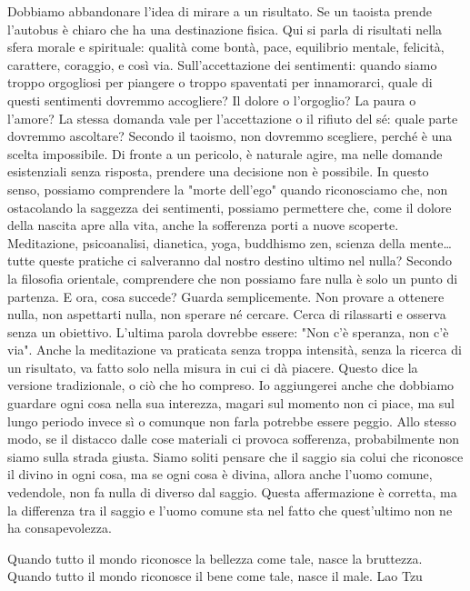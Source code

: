 \documentclass[12pt]{book} %
\begin{document}
Dobbiamo abbandonare l'idea di mirare a un risultato. Se un taoista prende l'autobus è chiaro che ha una destinazione fisica. Qui si parla di risultati nella sfera morale e spirituale: qualità come bontà, pace, equilibrio mentale, felicità, carattere, coraggio, e così via.
Sull'accettazione dei sentimenti: quando siamo troppo orgogliosi per piangere o troppo spaventati per innamorarci, quale di questi sentimenti dovremmo accogliere? Il dolore o l'orgoglio? La paura o l'amore?
La stessa domanda vale per l'accettazione o il rifiuto del sé: quale parte dovremmo ascoltare? Secondo il taoismo, non dovremmo scegliere, perché è una scelta impossibile. Di fronte a un pericolo, è naturale agire, ma nelle domande esistenziali senza risposta, prendere una decisione non è possibile.
In questo senso, possiamo comprendere la "morte dell'ego" quando riconosciamo che, non ostacolando la saggezza dei sentimenti, possiamo permettere che, come il dolore della nascita apre alla vita, anche la sofferenza porti a nuove scoperte.
Meditazione, psicoanalisi, dianetica, yoga, buddhismo zen, scienza della mente… tutte queste pratiche ci salveranno dal nostro destino ultimo nel nulla? Secondo la filosofia orientale, comprendere che non possiamo fare nulla è solo un punto di partenza. E ora, cosa succede? Guarda semplicemente. Non provare a ottenere nulla, non aspettarti nulla, non sperare né cercare. Cerca di rilassarti e osserva senza un obiettivo. L'ultima parola dovrebbe essere: "Non c'è speranza, non c'è via".
Anche la meditazione va praticata senza troppa intensità, senza la ricerca di un risultato, va fatto solo nella misura in cui ci dà piacere. Questo dice la versione tradizionale, o ciò che ho compreso. Io aggiungerei anche che dobbiamo guardare ogni cosa nella sua interezza, magari sul momento non ci piace, ma sul lungo periodo invece sì o comunque non farla potrebbe essere peggio. Allo stesso modo, se il distacco dalle cose materiali ci provoca sofferenza, probabilmente non siamo sulla strada giusta.
Siamo soliti pensare che il saggio sia colui che riconosce il divino in ogni cosa, ma se ogni cosa è divina, allora anche l'uomo comune, vedendole, non fa nulla di diverso dal saggio. Questa affermazione è corretta, ma la differenza tra il saggio e l'uomo comune sta nel fatto che quest'ultimo non ne ha consapevolezza. 

Quando tutto il mondo riconosce la bellezza come tale, nasce la bruttezza.
Quando tutto il mondo riconosce il bene come tale, nasce il male.
Lao Tzu
\end{document}
